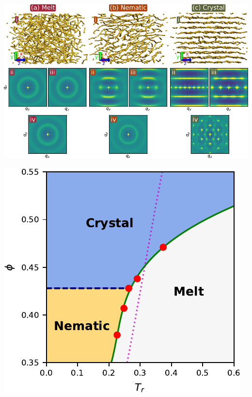 \documentclass[aspectratio=169]{beamer}
\begin{document}
\begin{frame}[c]{}

  \centering
  \includegraphics[height=\textheight]{../figures/fig-confs_plus_structs/fig-confs_plus_structs.pdf}

\end{frame}

\begin{frame}[c]{}

  \centering
  \includegraphics[height=\textheight]{../figures/ch4_jcp_from_diss/fig-phase_diag/fig-phase_diag.pdf}

\end{frame}
\end{document}
